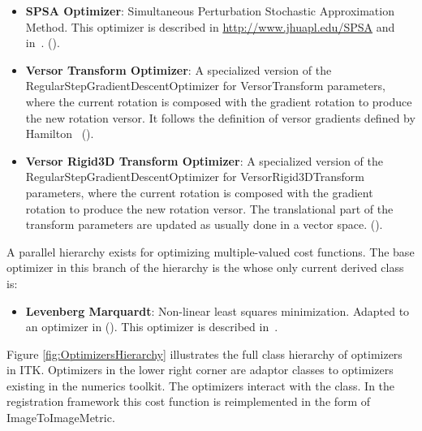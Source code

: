 \begin{itemize}
\item \textbf{SPSA Optimizer}: Simultaneous Perturbation Stochastic
Approximation Method. This optimizer is described in
\url{http://www.jhuapl.edu/SPSA} and in~\cite{Spall1998}.
(). 

\item \textbf{Versor Transform Optimizer}: A specialized version of the 
RegularStepGradientDescentOptimizer for VersorTransform
parameters, where the current rotation is composed with the gradient rotation
to produce the new rotation versor. It follows the definition of versor
gradients defined by Hamilton~\cite{Hamilton1866}
().

\item \textbf{Versor Rigid3D Transform Optimizer}: A specialized version of the
RegularStepGradientDescentOptimizer for VersorRigid3DTransform parameters,
where the current rotation is composed with the gradient rotation to produce
the new rotation versor. The translational part of the transform parameters are
updated as usually done in a vector space.
().


\end{itemize}

A parallel hierarchy exists for optimizing multiple-valued cost functions. The
base optimizer in this branch of the hierarchy is the
 whose only current derived class
is:

\begin{itemize}

\item \textbf{Levenberg Marquardt}: Non-linear least squares minimization.
Adapted to an optimizer in  ().
This optimizer is described in~\cite{Press1992}.

\end{itemize}


Figure \ref{fig:OptimizersHierarchy} illustrates the full class hierarchy of
optimizers in ITK. Optimizers in the lower right corner are adaptor classes
to optimizers existing in the  numerics toolkit. The optimizers
interact with the  class. In the registration framework
this cost function is reimplemented in the form of ImageToImageMetric.





